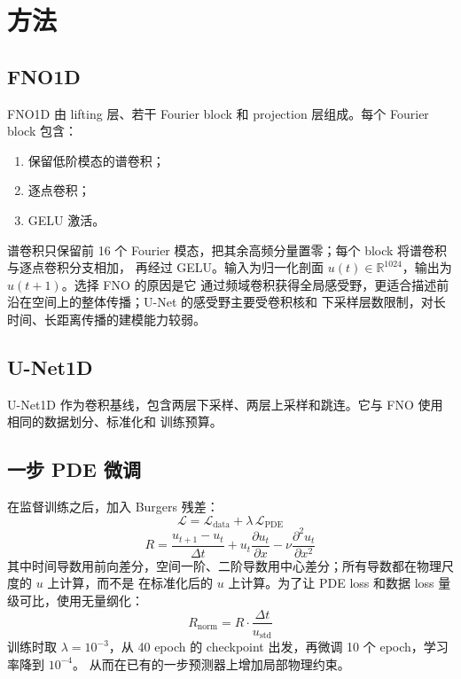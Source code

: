 \documentclass[a4paper,11pt,fontset=windows]{ctexart}
\begin{document}
\section{方法}

\subsection{FNO1D}

FNO1D 由 lifting 层、若干 Fourier block 和 projection 层组成。每个 Fourier block 包含：
\begin{enumerate}
  \item 保留低阶模态的谱卷积；
  \item 逐点卷积；
  \item GELU 激活。
\end{enumerate}

谱卷积只保留前 16 个 Fourier 模态，把其余高频分量置零；每个 block 将谱卷积与逐点卷积分支相加，
再经过 GELU。输入为归一化剖面 $u(t)\in\mathbb{R}^{1024}$，输出为 $u(t+1)$。选择 FNO 的原因是它
通过频域卷积获得全局感受野，更适合描述前沿在空间上的整体传播；U-Net 的感受野主要受卷积核和
下采样层数限制，对长时间、长距离传播的建模能力较弱。

\subsection{U-Net1D}

U-Net1D 作为卷积基线，包含两层下采样、两层上采样和跳连。它与 FNO 使用相同的数据划分、标准化和
训练预算。

\subsection{一步 PDE 微调}

在监督训练之后，加入 Burgers 残差：
\begin{equation}
  \mathcal{L} = \mathcal{L}_{\text{data}} + \lambda\,\mathcal{L}_{\text{PDE}}
\end{equation}
\begin{equation}
  R = \frac{u_{t+1}-u_t}{\Delta t} + u_t\frac{\partial u_t}{\partial x}
      - \nu\frac{\partial^2 u_t}{\partial x^2}
\end{equation}
其中时间导数用前向差分，空间一阶、二阶导数用中心差分；所有导数都在物理尺度的 $u$ 上计算，而不是
在标准化后的 $u$ 上计算。为了让 PDE loss 和数据 loss 量级可比，使用无量纲化：
\begin{equation}
  R_{\text{norm}} = R\cdot\frac{\Delta t}{u_{\text{std}}}
\end{equation}
训练时取 $\lambda=10^{-3}$，从 40 epoch 的 checkpoint 出发，再微调 10 个 epoch，学习率降到 $10^{-4}$。
从而在已有的一步预测器上增加局部物理约束。
\end{document}
